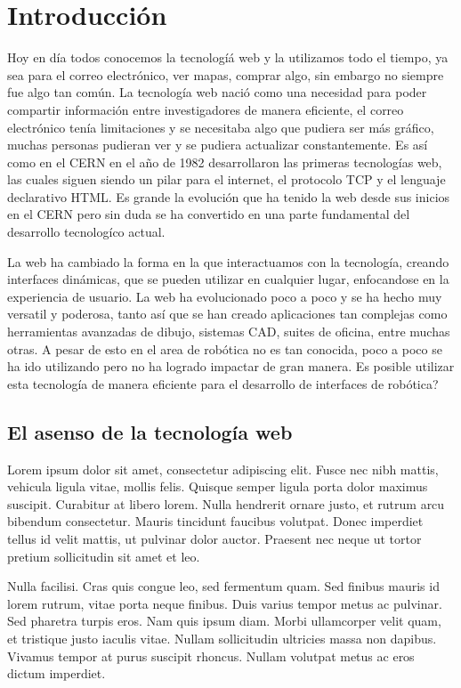 \chapter{Introducción}\label{ch:chapter1}

Hoy en día todos conocemos la tecnologíá web y la utilizamos todo el tiempo, ya sea para el correo electrónico, ver mapas, comprar algo, sin embargo no siempre fue algo tan común. La tecnología web nació como una necesidad para poder compartir información entre investigadores de manera eficiente, el correo electrónico tenía limitaciones y se necesitaba algo que pudiera ser más gráfico, muchas personas pudieran ver y se pudiera actualizar constantemente. Es así como en el CERN en el año de 1982 desarrollaron las primeras tecnologías web, las cuales siguen siendo un pilar para el internet, el protocolo TCP y el lenguaje declarativo HTML. Es grande la evolución que ha tenido la web desde sus inicios en el CERN pero sin duda se ha convertido en una parte fundamental del desarrollo tecnologíco actual.

La web ha cambiado la forma en la que interactuamos con la tecnología, creando interfaces dinámicas, que se pueden utilizar en cualquier lugar, enfocandose en la experiencia de usuario. La web ha evolucionado poco a poco y se ha hecho muy versatil y poderosa, tanto así que se han creado aplicaciones tan complejas como herramientas avanzadas de dibujo, sistemas CAD, suites de oficina, entre muchas otras. A pesar de esto en el area de robótica no es tan conocida, poco a poco se ha ido utilizando pero no ha logrado impactar de gran manera. Es posible utilizar esta tecnología de manera eficiente para el desarrollo de interfaces de robótica? 

\section{El asenso de la tecnología web}

Lorem ipsum dolor sit amet, consectetur adipiscing elit. Fusce nec nibh mattis, vehicula ligula vitae, mollis felis. Quisque semper ligula porta dolor maximus suscipit. Curabitur at libero lorem. Nulla hendrerit ornare justo, et rutrum arcu bibendum consectetur. Mauris tincidunt faucibus volutpat. Donec imperdiet tellus id velit mattis, ut pulvinar dolor auctor. Praesent nec neque ut tortor pretium sollicitudin sit amet et leo.

Nulla facilisi. Cras quis congue leo, sed fermentum quam. Sed finibus mauris id lorem rutrum, vitae porta neque finibus. Duis varius tempor metus ac pulvinar. Sed pharetra turpis eros. Nam quis ipsum diam. Morbi ullamcorper velit quam, et tristique justo iaculis vitae. Nullam sollicitudin ultricies massa non dapibus. Vivamus tempor at purus suscipit rhoncus. Nullam volutpat metus ac eros dictum imperdiet.

